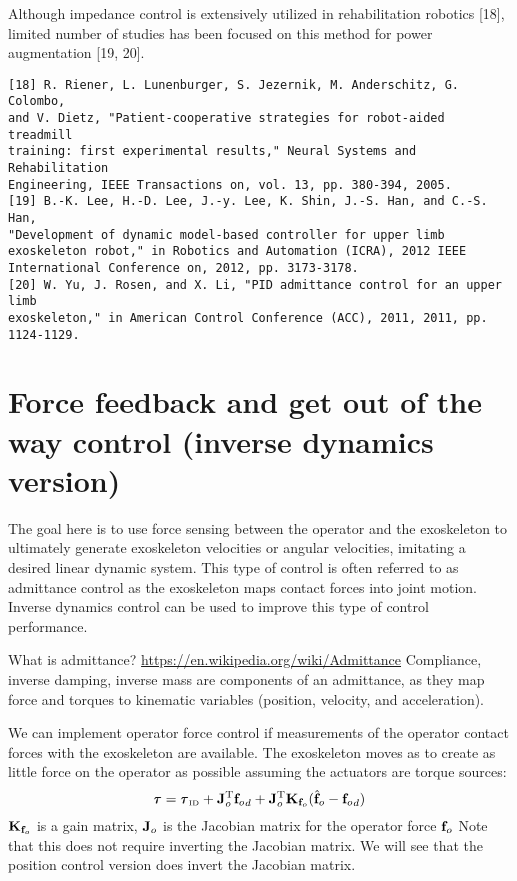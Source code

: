 \documentclass[letterpaper,12pt,fullpage]{article}
\newcommand{\invdyn}{{\mbox {\tiny ID}}}
\begin{document}
Although impedance control is extensively utilized in rehabilitation
robotics [18], limited number of studies has been focused on
this method for power augmentation [19, 20].
\begin{verbatim}
[18] R. Riener, L. Lunenburger, S. Jezernik, M. Anderschitz, G. Colombo,
and V. Dietz, "Patient-cooperative strategies for robot-aided treadmill
training: first experimental results," Neural Systems and Rehabilitation
Engineering, IEEE Transactions on, vol. 13, pp. 380-394, 2005.
[19] B.-K. Lee, H.-D. Lee, J.-y. Lee, K. Shin, J.-S. Han, and C.-S. Han,
"Development of dynamic model-based controller for upper limb
exoskeleton robot," in Robotics and Automation (ICRA), 2012 IEEE
International Conference on, 2012, pp. 3173-3178.
[20] W. Yu, J. Rosen, and X. Li, "PID admittance control for an upper limb
exoskeleton," in American Control Conference (ACC), 2011, 2011, pp.
1124-1129.
\end{verbatim}

\section{Force feedback and get out of the way control (inverse dynamics version)}

The goal here is to use force sensing between the operator and the
exoskeleton to ultimately generate exoskeleton velocities or angular velocities,
imitating a desired linear dynamic system.
This type of control is often referred to as admittance control as the
exoskeleton maps contact forces into joint motion.
Inverse dynamics control
can be used to improve this type of control performance.

What is admittance?
\url{https://en.wikipedia.org/wiki/Admittance}
Compliance, inverse damping, inverse mass are components of an admittance,
as they map force and torques to kinematic variables (position, velocity, and
acceleration). 

We can implement operator force control 
if measurements of the operator contact forces with
the exoskeleton are available.
The exoskeleton moves as to create as little force on the operator as possible 
assuming the actuators are torque sources:
\begin{equation}
\vtau = \vtau_{\invdyn} + \mJ_o^{\tr} {\vf_o}_d
+ \mJ_o^{\tr} \mK_{\vf_o} ( \hat{\vf}_o - {\vf_o}_d )
\end{equation}
${\bf K}_{{\bf f}_o}$ is a gain matrix, ${\bf J}_o$ is the Jacobian matrix for the operator
force ${\bf f}_o$
Note that this does not require inverting the Jacobian matrix.
We will see that the position control version does invert the Jacobian matrix.
\end{document}
